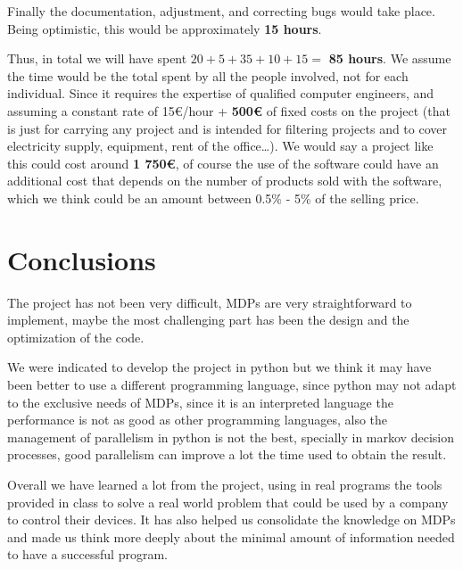 \documentclass[12pt]{article}
\begin{document}
Finally the documentation, adjustment, and correcting bugs would take place. Being optimistic, this would be approximately \textbf{15 hours}.\bigskip

Thus, in total we will have spent \(20+5+35+10+15 =\) \textbf{85 hours}.
We assume the time would be the total spent by all the people involved, not for each individual. Since it requires the expertise of qualified computer engineers, and assuming a constant rate of 15€/hour + \textbf{500€} of fixed costs on the project (that is just for carrying any project and is intended for filtering projects and to cover electricity supply, equipment, rent of the office\ldots{}). We would say a project like this could cost around \textbf{1 750€}, of course the use of the software could have an additional cost that depends on the number of products sold with the software, which we think could be an amount between 0.5\% - 5\% of the selling price.
\newpage
\section{Conclusions}
\label{sec:org9856ece}
The project has not been very difficult, MDPs are very straightforward to implement, maybe the most challenging part has been the design and the optimization of the code.\bigskip

We were indicated to develop the project in python but we think it may have been better to use a different programming language, since python may not adapt to the exclusive needs of MDPs, since it is an interpreted language the performance is not as good as other programming languages, also the management of parallelism in python is not the best, specially in markov decision processes, good parallelism can improve a lot the time used to obtain the result.\bigskip

Overall we have learned a lot from the project, using in real programs the tools provided in class to solve a real world problem that could be used by a company to control their devices. It has also helped us consolidate the knowledge on MDPs and made us think more deeply about the minimal amount of information needed to have a successful program.
\end{document}
